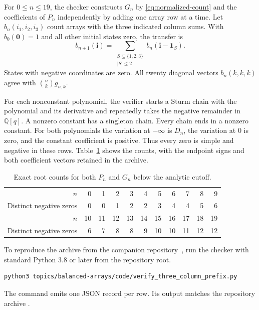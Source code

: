 \documentclass[11pt]{article}
\begin{document}
For \(0\le n\le19\), the checker constructs \(G_n\) by \eqref{eq:normalized-count} and the coefficients of \(P_n\) independently by adding one array row at a time. Let \(b_n(i_1,i_2,i_3)\) count arrays with the three indicated column sums. With \(b_0(\mathbf 0)=1\) and all other initial states zero, the transfer is
\[
b_{n+1}(\mathbf i)=\sum_{\substack{S\subseteq\{1,2,3\}\\|S|\le2}}
                 b_n(\mathbf i-\mathbf 1_S).
\]
States with negative coordinates are zero. All twenty diagonal vectors \(b_n(k,k,k)\) agree with \(\binom nk g_{n,k}\).

For each nonconstant polynomial, the verifier starts a Sturm chain with the polynomial and its derivative and repeatedly takes the negative remainder in \(\mathbb Q[q]\). A nonzero constant has a singleton chain. Every chain ends in a nonzero constant. For both polynomials the variation at \(-\infty\) is \(D_n\), the variation at \(0\) is zero, and the constant coefficient is positive. Thus every zero is simple and negative in these rows. Table~\ref{tab:prefix} shows the counts, with the endpoint signs and both coefficient vectors retained in the archive.

\begin{table}[htbp]
\centering
\small
\begin{tabular}{@{}r*{10}{r}@{}}
\toprule
\(n\) & 0&1&2&3&4&5&6&7&8&9\\
Distinct negative zeros &0&0&1&2&2&3&4&4&5&6\\
\midrule
\(n\) &10&11&12&13&14&15&16&17&18&19\\
Distinct negative zeros &6&7&8&8&9&10&10&11&12&12\\
\bottomrule
\end{tabular}
\caption{Exact root counts for both \(P_n\) and \(G_n\) below the analytic cutoff.}
\label{tab:prefix}
\end{table}

To reproduce the archive from the companion repository~\cite{code}, run the checker with standard Python 3.8 or later from the repository root.
\begin{verbatim}
python3 topics/balanced-arrays/code/verify_three_column_prefix.py
\end{verbatim}
The command emits one JSON record per row. Its output matches the repository archive .
\end{document}
